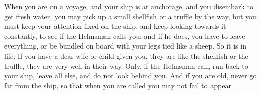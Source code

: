 When you are on  a voyage, and your ship is at anchorage,  and you disembark to
get fresh water, you may pick up a small shellfish or a truffle by the way, but
you must  keep your attention  fixed on the ship,  and keep looking  towards it
constantly, to see if the Helmsman calls you; and if he does, you have to leave
everything, or be bundled  on board with your legs tied like a  sheep. So it is
in  life. If  you have  a  dear wife  or child  given  you, they  are like  the
shellfish  or the  truffle, they  are  very well  in  their way.  Only, if  the
Helmsman call, run  back to your ship,  leave all else, and do  not look behind
you. And  if you  are old, never  go far from  the ship,  so that when  you are
called you may not fail to appear.
